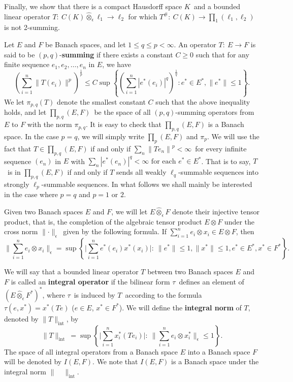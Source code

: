 \medskip

Finally, we show that there is a compact Hausdorff space $K$\
and a bounded linear operator $T:\ C(K)\hat \otimes_\epsilon
\ell_1\longrightarrow \ell_2$ for which $T^\#:\ C(K)\longrightarrow
\prod_1(\ell_1, \ell_2)$ is not 2-summing.

\bigskip
{}

Let $E$ and $F$ be Banach spaces, and let $1\leq q\leq p<\infty$.  An
operator $T:\ E\longrightarrow F$ is said to be $(p,q)$-{\bf summing} 
if
there exists a constant $C\ge 0$ such that for any finite sequence
$e_1, e_2,\ldots, e_n$ in $E$, we have
$$
\left(\sum\limits^n_{i=1}\parallel T(e_i)\parallel^p\right)^{\frac 
1p}\leq C\sup
\left\{\left(\sum\limits^n_{i=1}|e^*(e_i)|^q\right)^{\frac 1q}:e^*\in
E^*, \parallel e^*\parallel\leq 1\right\} .
$$
We let $\pi_{p,q}(T)$ denote the smallest constant $C$ such that the
above inequality holds, and let $\prod_{p,q}(E,F)$\ be the space of 
all
$(p,q)$-summing operators from $E$ to $F$ with the norm
$\pi_{p,q}$.  It is easy to check that $\prod_{p,q}(E,F)$ is a Banach
space.  In the case $p=q$, we will simply write $\prod_p(E,F)$ and 
$\pi_p$.
We will use the fact that $T\in \prod_{p,q}(E,F)$ if and only if 
$\sum\limits_n
\left\|
Te_n\right\|^{p} <\infty$\ for every
infinite sequence $(e_n)$ in $E$ with $\sum\limits_n
|e^*(e_n)|^q<\infty\text { for each }e^*\in E^*$. That is to say, $T$\ 
is in
$\prod_{p,q} (E,F)$ if and only if
$T$
sends all weakly $\ell_q$-summable sequences into strongly 
$\ell_p$-summable
sequences. In what follows we shall
mainly be interested in the case where $p=q$ and $p=1\text { or }2$.

\medskip

Given two Banach spaces $E$ and $F$, we will let $E\hat
\otimes_\epsilon F$ denote their injective tensor product,
that is, the completion of the algebraic tensor product $E\otimes F$
under the cross norm $\parallel \cdot \parallel_\epsilon$\ given by 
the
following formula. If $\sum\limits^n_{i=1} e_i\otimes x_i\in E\otimes 
F$,
then $$
\parallel \sum\limits^n_{i=1}e_i\otimes x_i\parallel_\epsilon
=\sup\left\{\Bigg|\sum\limits^n_{i=1}e^*(e_i)x^*(x_i)\Bigg|:\ 
\parallel
e^*\parallel \leq 1, \parallel x^*\parallel \leq 1, e^*\in E^*, x^*\in
F^*\right\}.
$$

\medskip

We will say that a bounded linear operator $T$ between two Banach 
spaces $E$
and $F$ is called an {\bf integral operator} if the bilinear form 
$\tau$\ defines
an element of $(E\hat \otimes_\epsilon F^*)^*$, where $\tau$\ is 
induced by
$T$\ according to the formula $\tau (e,x^*)=x^*(Te)$ ($e\in E$,
$x^*\in F^*$). We will define the {\bf integral norm} of $T$,
denoted by $\parallel T\parallel_{\text {int}}$, by
$$
\parallel T\parallel_{\text {int }}
=\sup\left\{\Bigg|\sum\limits^n_{i=1}x_i^*(Te_i)\Bigg|:\ \parallel
\sum\limits^n_{i=1}e_i\otimes x_i^*\parallel_\epsilon \leq 1\right\}.
$$
The space of all integral operators from a Banach space $E$ into a
Banach space $F$ will be denoted by $I(E,F)$.  We note that
$I(E,F)$ is a Banach space under the integral norm
$\parallel\quad\parallel_{\text {int}}$.  

